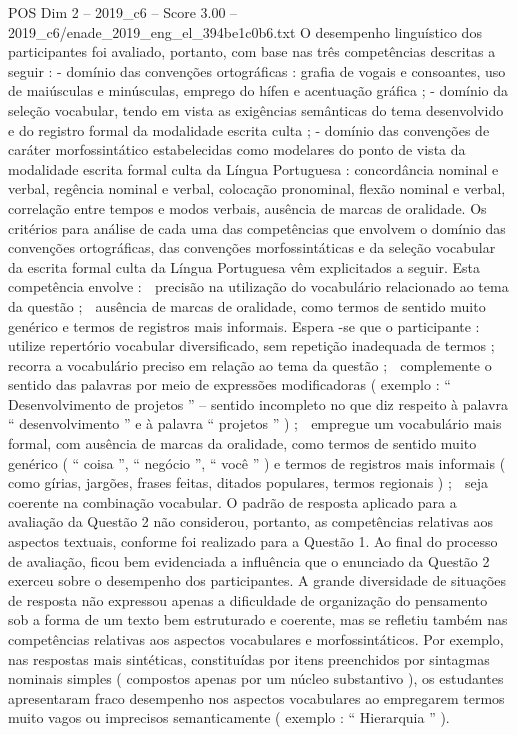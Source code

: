 \begin{textsample}{POS Dim 2 – 2019\_c6 – Score 3.00 – 2019\_c6/enade\_2019\_eng\_el\_394be1c0b6.txt}
O desempenho linguístico dos participantes foi avaliado, portanto, com base nas três competências descritas a seguir : - domínio das convenções ortográficas : grafia de vogais e consoantes, uso de maiúsculas e minúsculas, emprego do hífen e acentuação gráfica ; - domínio da seleção vocabular, tendo em vista as exigências semânticas do tema desenvolvido e do registro formal da modalidade escrita culta ; - domínio das convenções de caráter morfossintático estabelecidas como modelares do ponto de vista da modalidade escrita formal culta da Língua Portuguesa : concordância nominal e verbal, regência nominal e verbal, colocação pronominal, flexão nominal e verbal, correlação entre tempos e modos verbais, ausência de marcas de oralidade.
Os critérios para análise de cada uma das competências que envolvem o domínio das convenções ortográficas, das convenções morfossintáticas e da seleção vocabular da escrita formal culta da Língua Portuguesa vêm explicitados a seguir.
Esta competência envolve :  precisão na utilização do vocabulário relacionado ao tema da questão ;  ausência de marcas de oralidade, como termos de sentido muito genérico e termos de registros mais informais.
Espera -se que o participante :  utilize repertório vocabular diversificado, sem repetição inadequada de termos ;  recorra a vocabulário preciso em relação ao tema da questão ;  complemente o sentido das palavras por meio de expressões modificadoras ( exemplo : “ Desenvolvimento de projetos ” – sentido incompleto no que diz respeito à palavra “ desenvolvimento ” e à palavra “ projetos ” ) ;  empregue um vocabulário mais formal, com ausência de marcas da oralidade, como termos de sentido muito genérico ( “ coisa ”, “ negócio ”, “ você ” ) e termos de registros mais informais ( como gírias, jargões, frases feitas, ditados populares, termos regionais ) ;  seja coerente na combinação vocabular.
O padrão de resposta aplicado para a avaliação da Questão 2 não considerou, portanto, as competências relativas aos aspectos textuais, conforme foi realizado para a Questão 1.
Ao final do processo de avaliação, ficou bem evidenciada a influência que o enunciado da Questão 2 exerceu sobre o desempenho dos participantes.
A grande diversidade de situações de resposta não expressou apenas a dificuldade de organização do pensamento sob a forma de um texto bem estruturado e coerente, mas se refletiu também nas competências relativas aos aspectos vocabulares e morfossintáticos.
Por exemplo, nas respostas mais sintéticas, constituídas por itens preenchidos por sintagmas nominais simples ( compostos apenas por um núcleo substantivo ), os estudantes apresentaram fraco desempenho nos aspectos vocabulares ao empregarem termos muito vagos ou imprecisos semanticamente ( exemplo : “ Hierarquia ” ).

\end{textsample}
